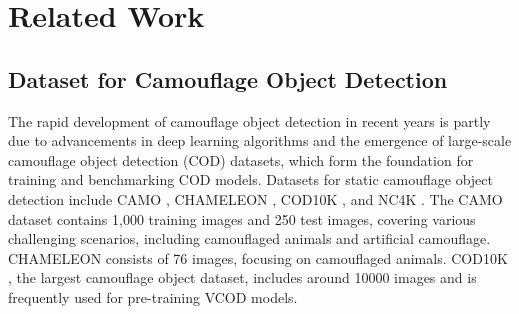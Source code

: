 \section{Related Work}
\subsection{Dataset for Camouflage Object Detection}



The rapid development of camouflage object detection in recent years is partly due to advancements in deep learning algorithms and the emergence of large-scale camouflage object detection (COD) datasets, which form the foundation for training and benchmarking COD models. Datasets for static camouflage object detection include CAMO \cite{camo}, CHAMELEON \cite{chameleon}, COD10K \cite{fan2020camouflaged}, and NC4K \cite{Lv2021-RankNet}. The CAMO dataset \cite{camo} contains 1,000 training images and 250 test images, covering various challenging scenarios, including camouflaged animals and artificial camouflage. CHAMELEON \cite{chameleon} consists of 76 images, focusing on camouflaged animals. COD10K \cite{fan2020camouflaged}, the largest camouflage object dataset, includes around 10000 images and is frequently used for pre-training VCOD models.

